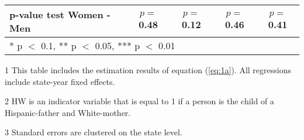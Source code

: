 \begin{table}[H]
\begin{threeparttable}
\begin{tabular}[t]{lcccc}
p-value test Women - Men & $p=$0.48 & $p=$0.12 & $p=$0.46 & $p=$0.41\\
\bottomrule
\multicolumn{5}{l}{\rule{0pt}{1em}* p $<$ 0.1, ** p $<$ 0.05, *** p $<$ 0.01}\\
\end{tabular}
\begin{tablenotes}
\item[1] {\footnotesize{This table includes the estimation results of equation (\ref{eq:1a}). All regressions include state-year fixed effects.}}
\item[2] {\footnotesize{HW is an indicator variable that is equal to 1 if a person is the child of a Hispanic-father and White-mother.}}
\item[3] {\footnotesize{Standard errors are clustered on the state level.}}
\end{tablenotes}
\end{threeparttable}
\end{table}
